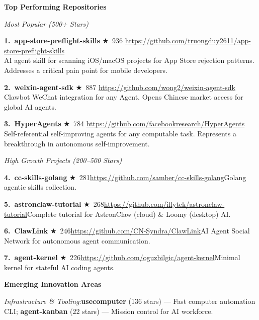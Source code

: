 \begin{mdframed}[
  linewidth=0.8pt,
  linecolor=black!40,
  backgroundcolor=black!2,
  innertopmargin=16pt,
  innerbottommargin=16pt,
  innerleftmargin=18pt,
  innerrightmargin=18pt,
  roundcorner=4pt
]
\vspace{8pt}
\noindent\textbf{Top Performing Repositories}

\vspace{4pt}
\noindent\textit{Most Popular (500+ Stars)}

\vspace{2pt}
\noindent\textbf{1.~app-store-preflight-skills} $\bigstar$~936\quad
\url{https://github.com/truongduy2611/app-store-preflight-skills}\\
AI agent skill for scanning iOS/macOS projects for App Store rejection patterns. Addresses a critical pain point for mobile developers.

\vspace{4pt}
\noindent\textbf{2.~weixin-agent-sdk} $\bigstar$~887\quad
\url{https://github.com/wong2/weixin-agent-sdk}\\
Clawbot WeChat integration for any Agent. Opens Chinese market access for global AI agents.

\vspace{4pt}
\noindent\textbf{3.~HyperAgents} $\bigstar$~784\quad
\url{https://github.com/facebookresearch/HyperAgents}\\
Self-referential self-improving agents for any computable task. Represents a breakthrough in autonomous self-improvement.

\vspace{6pt}
\noindent\textit{High Growth Projects (200--500 Stars)}

\vspace{2pt}
\noindent\textbf{4.~cc-skills-golang} $\bigstar$~281\quad \url{https://github.com/samber/cc-skills-golang}\quad Golang agentic skills collection.

\noindent\textbf{5.~astronclaw-tutorial} $\bigstar$~268\quad \url{https://github.com/iflytek/astronclaw-tutorial}\quad Complete tutorial for AstronClaw (cloud) \& Loomy (desktop) AI.

\noindent\textbf{6.~ClawLink} $\bigstar$~246\quad \url{https://github.com/CN-Syndra/ClawLink}\quad AI Agent Social Network for autonomous agent communication.

\noindent\textbf{7.~agent-kernel} $\bigstar$~226\quad \url{https://github.com/oguzbilgic/agent-kernel}\quad Minimal kernel for stateful AI coding agents.

\vspace{8pt}
\noindent\textbf{Emerging Innovation Areas}

\noindent\textit{Infrastructure \& Tooling}:\quad \textbf{usecomputer} (136 stars) --- Fast computer automation CLI; \textbf{agent-kanban} (22 stars) --- Mission control for AI workforce.


\end{mdframed}
